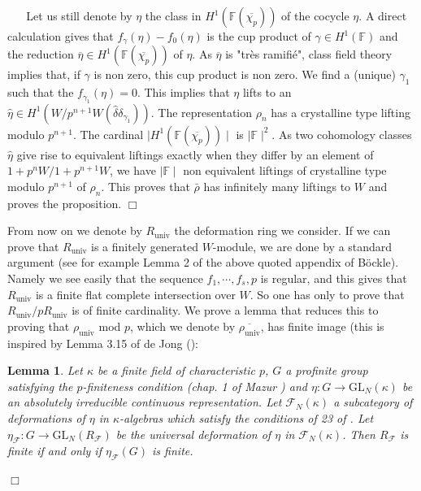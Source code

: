 \documentclass[12pt]{article}
\newcommand{\GL}{\mathrm{GL}}
\newtheorem{lemma}[theorem]{Lemma}
\newenvironment{proof}{\smallskip\noindent{\bf Proof.}\
}{$\Box$\smallskip\goodbreak}
\def\rhob{ {\bar {\rho} } }
\newcommand{\F}{{\mathbb F}}
\begin{document}
\begin{proof}
\begin{proof}
Let us still denote by $\eta$ the  class
in $H^1(\F (\overline{\chi _p } ) )$ of the cocycle $\eta$.
A direct calculation gives that
$f_{\gamma}(\eta)- f_0 (\eta )$ is the cup product of
$\gamma\in H^1 (\F )$ and the reduction
$\overline{\eta }\in H^1 (\F (\overline{\chi _p}))$
of $\eta$.
As $\overline{\eta }$ is "tr\`es ramifi\'e", class field theory
implies that, if $\gamma$ is non zero, this cup product is non zero.
We find a (unique) $\gamma_1$ such that the
$f_{\gamma_1}(\eta)=0$. This implies that
$\eta$ lifts to an $\widehat{\eta}\in H^1 (W/ p^{n+1} W ( \widehat{\delta}
\delta _{\gamma_1}))$. The representation
$\rho _n$  has
a crystalline type lifting modulo $p^{n+1}$.
The cardinal $\mid  H^1 (\F (\overline{\chi _p } )) \mid$
is $\mid \F \mid ^2$. As two cohomology classes $\widehat{\eta}$ give
rise to equivalent liftings exactly when they differ by an element
of $1+p^n W/1+p^{n+1} W$,  we have $\mid \F\mid$
non equivalent liftings of crystalline type modulo $p^{n+1}$ of
$\rho _n$. This proves that $\rhob$ has infinitely many liftings
to $W$ and proves the proposition.
\end{proof}


From now on we denote by $R_{\mathrm{univ}}$ the deformation
ring we consider.
If we can prove that $R_{\mathrm{univ}}$ is a finitely generated
$W$-module, we are done by a standard argument (see for example Lemma 2
of the above quoted appendix of B\"{o}ckle). Namely we see easily
that the sequence $f_1,\cdots,f_s,p$ is regular, and this gives
that $R_{\mathrm{univ}}$ is a finite flat complete intersection over $W$.
So one has only to prove that $R_{\mathrm{univ}}/pR_{\mathrm{univ}}$
is of finite cardinality. We prove a lemma that reduces this to proving that
$\rho_{\mathrm{univ}}$ mod $p$,
which we denote by $\overline{\rho_{\mathrm{univ}}}$, has finite image
(this is inspired
by Lemma 3.15 of de Jong (\cite{[dJ01]}):

\begin{lemma}\label{finite} Let $\kappa$ be a finite field of characteristic
$p$, $G$ a profinite group satisfying the $p$-finiteness
condition (chap. 1 of Mazur \cite{[M97]})
and $\eta: G\rightarrow \GL _N (\kappa )$ be an
absolutely irreducible continuous representation. Let
$\mathcal{F}_N (\kappa )$ a subcategory of  deformations of $\eta $
in $\kappa$-algebras which satisfy the conditions
of 23 of \cite{[M97]}. Let
$\eta_{\mathcal{F}} : G\rightarrow \GL_N (R_{\mathcal{F}} )$
be the universal deformation
of $\eta$ in $\mathcal{F}_N (\kappa )$.
Then $R_{\mathcal{F}}$  is finite if and only
if $\eta_{\mathcal{F}} (G )$ is
finite.\end{lemma}


\end{proof}
\end{document}
